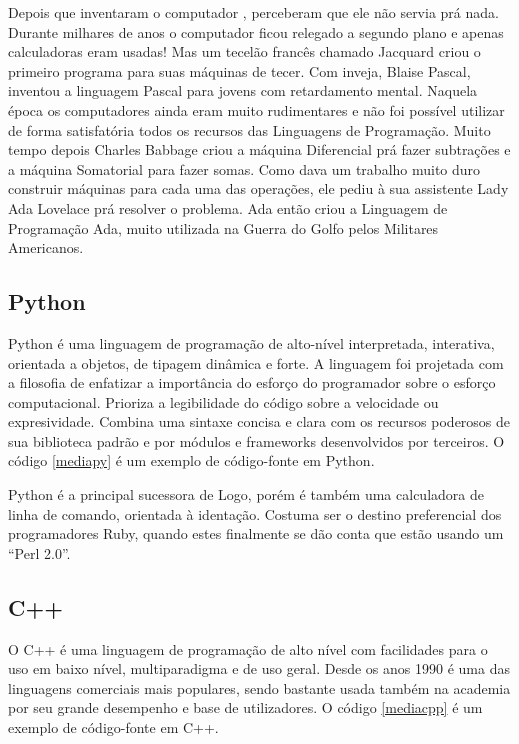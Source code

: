 Depois que inventaram o computador , perceberam que ele não servia prá nada. Durante milhares de anos o computador ficou relegado a segundo plano e apenas calculadoras eram usadas! Mas um tecelão francês chamado Jacquard criou o primeiro programa para suas máquinas de tecer. Com inveja, Blaise Pascal, inventou a linguagem Pascal para jovens com retardamento mental. Naquela época os computadores ainda eram muito rudimentares e não foi possível utilizar de forma satisfatória todos os recursos das Linguagens de Programação. Muito tempo depois Charles Babbage criou a máquina Diferencial prá fazer subtrações e a máquina Somatorial para fazer somas. Como dava um trabalho muito duro construir máquinas para cada uma das operações, ele pediu à sua assistente Lady Ada Lovelace prá resolver o problema. Ada então criou a Linguagem de Programação Ada, muito utilizada na Guerra do Golfo pelos Militares Americanos.

\subsection{Python}

Python é uma linguagem de programação de alto-nível interpretada, interativa, orientada a objetos, de tipagem dinâmica e forte. A linguagem foi projetada com a filosofia de enfatizar a importância do esforço do programador sobre o esforço computacional. Prioriza a legibilidade do código sobre a velocidade ou expresividade. Combina uma sintaxe concisa e clara com os recursos poderosos de sua biblioteca padrão e por módulos e frameworks desenvolvidos por terceiros. O código \ref{mediapy} é um exemplo de código-fonte em Python.

Python é a principal sucessora de Logo, porém é também uma calculadora de linha de comando, orientada à identação. Costuma ser o destino preferencial dos programadores Ruby, quando estes finalmente se dão conta que estão usando um ``Perl 2.0''. 

\subsection{C++}

O C++ é uma linguagem de programação de alto nível com facilidades para o uso em baixo nível, multiparadigma e de uso geral. Desde os anos 1990 é uma das linguagens comerciais mais populares, sendo bastante usada também na academia por seu grande desempenho e base de utilizadores.  O código \ref{mediacpp} é um exemplo de código-fonte em C++.


